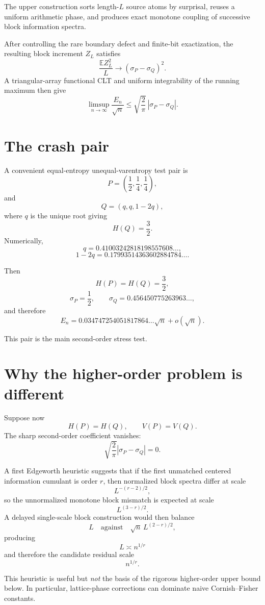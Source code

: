 \documentclass[11pt,a4paper]{article}
\newcommand{\E}{\mathbb E}
\begin{document}
The upper construction sorts length-\(L\) source atoms by surprisal, reuses
a uniform arithmetic phase, and produces exact monotone coupling of
successive block information spectra.

After controlling the rare boundary defect and finite-bit exactization,
the resulting block increment \(Z_L\) satisfies
\[
\frac{\E Z_L^2}{L}
\longrightarrow
(\sigma_P-\sigma_Q)^2.
\]
A triangular-array functional CLT and uniform integrability of the running
maximum then give
\[
\limsup_{n\to\infty}
\frac{E_n}{\sqrt n}
\le
\sqrt{\frac{2}{\pi}}\,
|\sigma_P-\sigma_Q|.
\]

\section{The crash pair}

A convenient equal-entropy unequal-varentropy test pair is
\[
P=\left(\frac12,\frac14,\frac14\right),
\]
and
\[
Q=(q,q,1-2q),
\]
where \(q\) is the unique root giving
\[
H(Q)=\frac32.
\]
Numerically,
\[
q=0.41003242818198557608\ldots,
\]
\[
1-2q
=
0.17993514363602884784\ldots.
\]

Then
\[
H(P)=H(Q)=\frac32,
\]
\[
\sigma_P=\frac12,
\qquad
\sigma_Q
=
0.456450775263963\ldots,
\]
and therefore
\[
\boxed{
E_n
=
0.034747254051817864\ldots\sqrt n
+
o(\sqrt n).
}
\]

This pair is the main second-order stress test.

\section{Why the higher-order problem is different}

Suppose now
\[
H(P)=H(Q),
\qquad
V(P)=V(Q).
\]
The sharp second-order coefficient vanishes:
\[
\sqrt{\frac{2}{\pi}}|\sigma_P-\sigma_Q|=0.
\]

A first Edgeworth heuristic suggests that if the first unmatched centered
information cumulant is order \(r\), then normalized block spectra differ
at scale
\[
L^{-(r-2)/2},
\]
so the unnormalized monotone block mismatch is expected at scale
\[
L^{(3-r)/2}.
\]
A delayed single-scale block construction would then balance
\[
L
\quad\text{against}\quad
\sqrt n\,L^{(2-r)/2},
\]
producing
\[
L\asymp n^{1/r}
\]
and therefore the candidate residual scale
\[
n^{1/r}.
\]

This heuristic is useful but \emph{not} the basis of the rigorous
higher-order upper bound below.  In particular, lattice-phase corrections
can dominate naive Cornish--Fisher constants.
\end{document}
